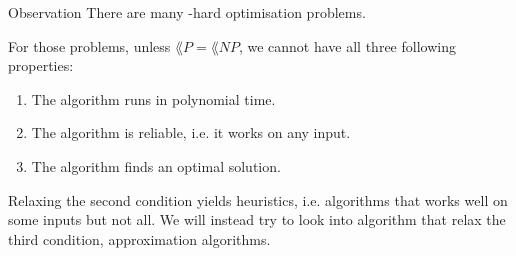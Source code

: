 \documentclass[a4paper]{article}
\begin{document}
\begin{parag}{Observation}
    There are many -hard optimisation problems. 

    For those problems, unless $\lang{P} = \lang{NP}$, we cannot have all three following properties:
    \begin{enumerate}
        \item The algorithm runs in polynomial time.
        \item The algorithm is reliable, i.e. it works on any input.
        \item The algorithm finds an optimal solution.
    \end{enumerate}

    Relaxing the second condition yields heuristics, i.e. algorithms that works well on some inputs but not all. We will instead try to look into algorithm that relax the third condition, approximation algorithms.
\end{parag}
\end{document}
